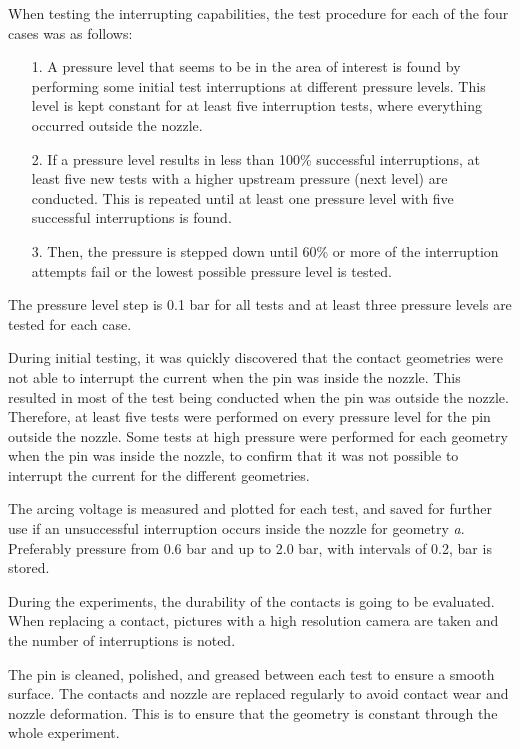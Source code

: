 \documentclass[10pt,a4paper,twoside]{article}
\begin{document}
When testing the interrupting capabilities, the test procedure for each of the four cases was as follows: 

\begin{itemize}
\item[1.] A pressure level that seems to be in the area of interest is found by performing some initial test interruptions at different pressure levels. This level is kept constant for at least five interruption tests, where everything occurred outside the nozzle.
\item[2.] If a pressure level results in less than 100\% successful interruptions, at least five new tests with a higher upstream pressure (next level) are conducted. This is repeated until at least one pressure level with five successful interruptions is found.
\item[3.] Then, the pressure is stepped down until 60\% or more of the interruption attempts fail or the lowest possible pressure level is tested.
\end{itemize}

The pressure level step is 0.1 bar for all tests and at least three pressure levels are tested for each case.\newline

During initial testing, it was quickly discovered that the contact geometries were not able to interrupt the current when the pin was inside the nozzle. This resulted in most of the test being conducted when the pin was outside the nozzle. Therefore, at least five tests were performed on every pressure level for the pin outside the nozzle. Some tests at high pressure were performed for each geometry when the pin was inside the nozzle, to confirm that it was not possible to interrupt the current for the different geometries.

The arcing voltage is measured and plotted for each test, and saved for further use if an unsuccessful interruption occurs inside the nozzle for geometry \textit{a}. Preferably pressure from 0.6 bar and up to 2.0 bar, with intervals of 0.2, bar is stored.

During the experiments, the durability of the contacts is going to be evaluated. When replacing a contact, pictures with a high resolution camera are taken and the number of interruptions is noted. 

The pin is cleaned, polished, and greased between each test to ensure a smooth surface. The contacts and nozzle are replaced regularly to avoid contact wear and nozzle deformation. This is to ensure that the geometry is constant through the whole experiment.
\end{document}
